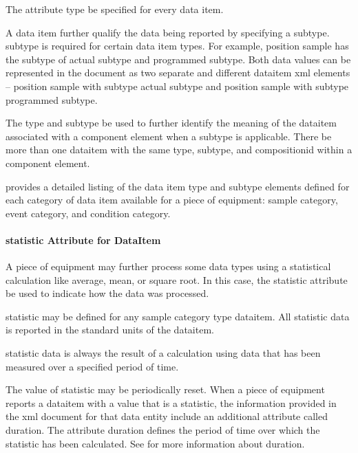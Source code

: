 The attribute \gls{type} \must be specified for every data item.

A data item \may further qualify the data being reported by specifying a \gls{subtype}.  \gls{subtype} is required for certain data item \glspl{type}.  For example, \gls{position sample} has the \gls{subtype} of \gls{actual subtype} and \gls{programmed subtype}.  Both data values can be represented in the document as two separate and different \gls{dataitem} \gls{xml} elements – \gls{position sample} with \gls{subtype} \gls{actual subtype} and \gls{position sample} with \gls{subtype} \gls{programmed subtype}.

The \gls{type} and \gls{subtype} \should be used to further identify the meaning of the \gls{dataitem} associated with a \gls{component} element when a \gls{subtype} is applicable.  There \shouldnot be more than one \gls{dataitem} with the same \gls{type}, \gls{subtype}, and \gls{compositionid} within a \gls{component} element.

 provides a detailed listing of the data item \gls{type} and \gls{subtype} elements defined for each \gls{category} of data item available for a piece of equipment: \gls{sample category}, \gls{event category}, and \gls{condition category}.

\paragraph{statistic Attribute for DataItem}\mbox{}

A piece of equipment may further process some data types using a statistical calculation like average, mean, or square root.  In this case, the \gls{statistic} attribute \may be used to indicate how the data was processed.  

\gls{statistic} may be defined for any \gls{sample category} type \gls{dataitem}.   All statistic data is reported in the standard units of the \gls{dataitem}.

\gls{statistic} data is always the result of a calculation using data that has been measured over a specified period of time. 

The value of \gls{statistic} may be periodically reset.   When a piece of equipment reports a \gls{dataitem} with a value that is a \gls{statistic}, the information provided in the \gls{xml} document for that \gls{data entity} \must include an additional attribute called \gls{duration}.   The attribute \gls{duration} defines the period of time over which the \gls{statistic} has been calculated.   See  for more information about \gls{duration}.

